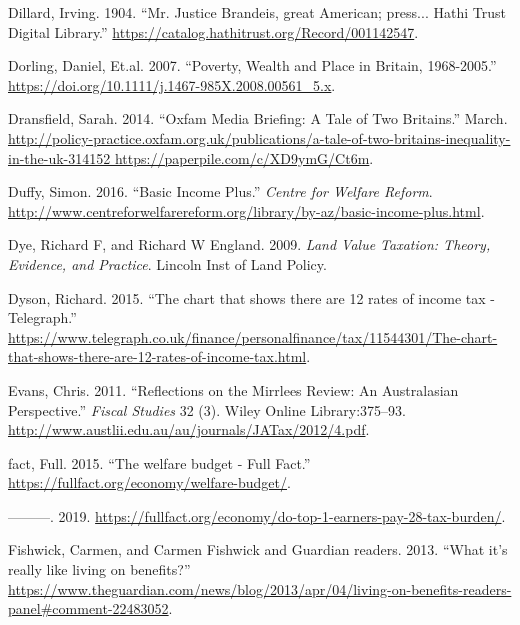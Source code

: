\documentclass[]{tufte-handout}
\begin{document}
\leavevmode\hypertarget{ref-Dillard1904}{}%
Dillard, Irving. 1904. ``Mr. Justice Brandeis, great American; press...
\textbar{} Hathi Trust Digital Library.''
\url{https://catalog.hathitrust.org/Record/001142547}.

\leavevmode\hypertarget{ref-DorlingDaniel2007}{}%
Dorling, Daniel, Et.al. 2007. ``Poverty, Wealth and Place in Britain,
1968-2005.'' \url{https://doi.org/10.1111/j.1467-985X.2008.00561_5.x}.

\leavevmode\hypertarget{ref-Dransfield2014}{}%
Dransfield, Sarah. 2014. ``Oxfam Media Briefing: A Tale of Two
Britains.'' March.
\href{http://policy-practice.oxfam.org.uk/publications/a-tale-of-two-britains-inequality-in-the-uk-314152\%20https://paperpile.com/c/XD9ymG/Ct6m}{http://policy-practice.oxfam.org.uk/publications/a-tale-of-two-britains-inequality-in-the-uk-314152 https://paperpile.com/c/XD9ymG/Ct6m}.

\leavevmode\hypertarget{ref-Duffy}{}%
Duffy, Simon. 2016. ``Basic Income Plus.'' \emph{Centre for Welfare
Reform}.
\url{http://www.centreforwelfarereform.org/library/by-az/basic-income-plus.html}.

\leavevmode\hypertarget{ref-Dye2009}{}%
Dye, Richard F, and Richard W England. 2009. \emph{Land Value Taxation:
Theory, Evidence, and Practice}. Lincoln Inst of Land Policy.

\leavevmode\hypertarget{ref-Dyson2015}{}%
Dyson, Richard. 2015. ``The chart that shows there are 12 rates of
income tax - Telegraph.''
\url{https://www.telegraph.co.uk/finance/personalfinance/tax/11544301/The-chart-that-shows-there-are-12-rates-of-income-tax.html}.

\leavevmode\hypertarget{ref-evans2011reflections}{}%
Evans, Chris. 2011. ``Reflections on the Mirrlees Review: An
Australasian Perspective.'' \emph{Fiscal Studies} 32 (3). Wiley Online
Library:375--93.
\url{http://www.austlii.edu.au/au/journals/JATax/2012/4.pdf}.

\leavevmode\hypertarget{ref-Fullfact2015}{}%
fact, Full. 2015. ``The welfare budget - Full Fact.''
\url{https://fullfact.org/economy/welfare-budget/}.

\leavevmode\hypertarget{ref-FullFact2019}{}%
---------. 2019.
\url{https://fullfact.org/economy/do-top-1-earners-pay-28-tax-burden/}.

\leavevmode\hypertarget{ref-Fishwick2013}{}%
Fishwick, Carmen, and Carmen Fishwick and Guardian readers. 2013. ``What
it's really like living on benefits?''
\url{https://www.theguardian.com/news/blog/2013/apr/04/living-on-benefits-readers-panel\#comment-22483052}.
\end{document}
